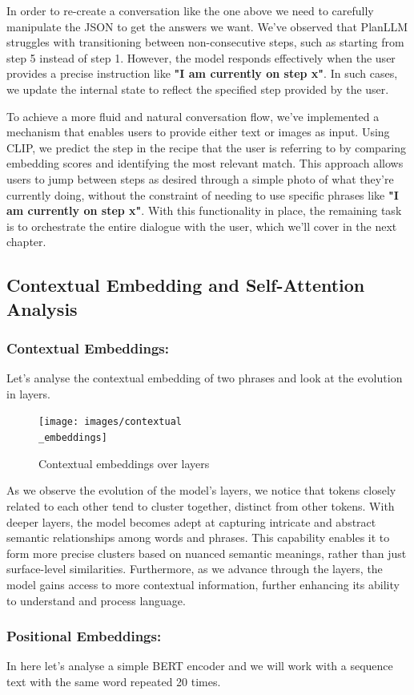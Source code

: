\documentclass[runningheads]{llncs}
\begin{document}
In order to re-create a conversation like the one above we need to carefully manipulate the JSON to get the answers we want. We've observed that PlanLLM struggles with transitioning between non-consecutive steps, such as starting from step 5 instead of step 1. However, the model responds effectively when the user provides a precise instruction like \textbf{"I am currently on step x"}. In such cases, we update the internal state to reflect the specified step provided by the user.

To achieve a more fluid and natural conversation flow, we've implemented a mechanism that enables users to provide either text or images as input. Using CLIP, we predict the step in the recipe that the user is referring to by comparing embedding scores and identifying the most relevant match. This approach allows users to jump between steps as desired through a simple photo of what they're currently doing, without the constraint of needing to use specific phrases like \textbf{"I am currently on step x"}. With this functionality in place, the remaining task is to orchestrate the entire dialogue with the user, which we'll cover in the next chapter.

\subsection{Contextual Embedding and Self-Attention Analysis}
\subsubsection{Contextual Embeddings:}
Let's analyse the contextual embedding of two phrases and look at the evolution in layers.

\begin{figure}[!htbp]
    \center
    \texttt{[image: images/contextual\\\_embeddings]}
    \caption{Contextual embeddings over layers}
\end{figure}
As we observe the evolution of the model's layers, we notice that tokens closely related to each other tend to cluster together, distinct from other tokens. With deeper layers, the model becomes adept at capturing intricate and abstract semantic relationships among words and phrases. This capability enables it to form more precise clusters based on nuanced semantic meanings, rather than just surface-level similarities. Furthermore, as we advance through the layers, the model gains access to more contextual information, further enhancing its ability to understand and process language.\subsubsection{Positional Embeddings:}
In here let's analyse a simple BERT encoder and we will work with a sequence text with the same word repeated 20 times.\\[10pt]
\end{document}
